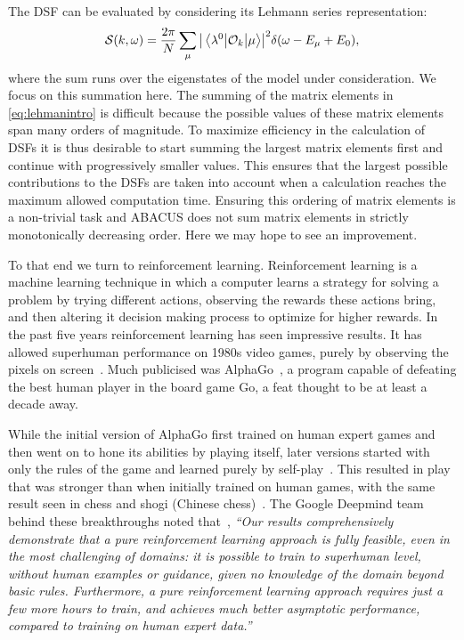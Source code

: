 \documentclass[11pt, a4paper]{report} %
\begin{document}
The DSF can be evaluated by considering its Lehmann series representation:
\begin{equation}\label{eq:lehmanintro}
  \mathcal{S}(k,\omega) = \frac{2\pi}{N}\sum_{\mu}\abs{\mel{\lambda^0}{\mathcal{O}_k}{\mu}}^2 \delta\qty(\omega-E_{\mu}+E_0), 
\end{equation}
where the sum runs over the eigenstates of the model under consideration.
We focus on this summation here.
The summing of the matrix elements in \cref{eq:lehmanintro} is difficult because the possible values of these matrix elements span many orders of magnitude.
To maximize efficiency in the calculation of DSFs it is thus desirable to start summing the largest matrix elements first and continue with progressively smaller values.
This ensures that the largest possible contributions to the DSFs are taken into account when a calculation reaches the maximum allowed computation time.
Ensuring this ordering of matrix elements is a non-trivial task and ABACUS does not sum matrix elements in strictly monotonically decreasing order.
Here we may hope to see an improvement.

To that end we turn to reinforcement learning.
Reinforcement learning is a machine learning technique in which a computer learns a strategy for solving a problem by trying different actions, observing the rewards these actions bring, and then altering it decision making process to optimize for higher rewards.
In the past five years reinforcement learning has seen impressive results.
It has allowed superhuman performance on 1980s video games, purely by observing the pixels on screen~\cite{mnih13_playin_atari_with_deep_reinf_learn,mnih15_human_level_contr_throug_deep_reinf_learn}.
Much publicised was AlphaGo~\cite{silver16_master_game_go_with_deep}, a program capable of defeating the best human player in the board game Go, a feat thought to be at least a decade away.

While the initial version of AlphaGo first trained on human expert games and then went on to hone its abilities by playing itself, later versions started with only the rules of the game and learned purely by self-play~\cite{Silver2017a}.
This resulted in play that was stronger than when initially trained on human games, with the same result seen in chess and shogi (Chinese chess)~\cite{Silver2017}.
The Google Deepmind team behind these breakthroughs noted that~\cite{Silver2017a}, \textit{``Our results comprehensively demonstrate that a pure reinforcement learning approach is fully feasible, even in the most challenging of domains: it is possible to train to superhuman level, without human examples or guidance, given no knowledge of the domain beyond basic rules. Furthermore, a pure reinforcement learning approach requires just a few more hours to train, and achieves much better asymptotic performance, compared to training on human expert data.''}
\end{document}
